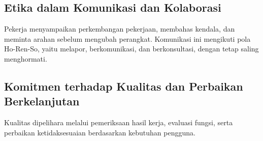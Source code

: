 \subsection{Etika dalam Komunikasi dan Kolaborasi}

Pekerja menyampaikan perkembangan pekerjaan, membahas kendala, dan meminta arahan sebelum mengubah perangkat. Komunikasi ini mengikuti pola Ho-Ren-So, yaitu melapor, berkomunikasi, dan berkonsultasi, dengan tetap saling menghormati.

\subsection{Komitmen terhadap Kualitas dan Perbaikan Berkelanjutan}

Kualitas dipelihara melalui pemeriksaan hasil kerja, evaluasi fungsi, serta perbaikan ketidaksesuaian berdasarkan kebutuhan pengguna.

\endgroup
